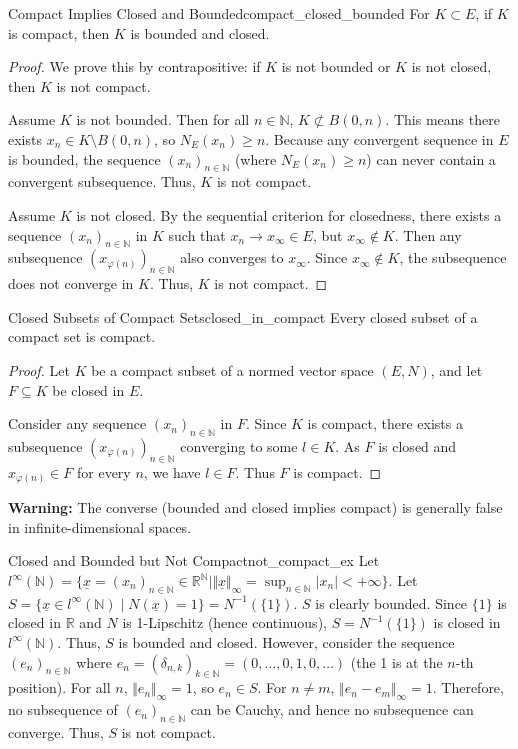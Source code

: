 \documentclass[11pt, a4paper]{article}
\newcommand{\R}{\mathbb{R}}
\newcommand{\N}{\mathbb{N}}
\begin{document}
\begin{proposition}{Compact Implies Closed and Bounded}{compact_closed_bounded}
For $K \subset E$, if $K$ is compact, then $K$ is bounded and closed.
\end{proposition}
\begin{proof}
We prove this by contrapositive: if $K$ is not bounded or $K$ is not closed, then $K$ is not compact.

Assume $K$ is not bounded.
Then for all $n \in \N$, $K \not\subset B(0, n)$. This means there exists $x_n \in K \setminus B(0, n)$, so $N_E(x_n) \ge n$.
Because any convergent sequence in $E$ is bounded, the sequence $(x_n)_{n \in \N}$ (where $N_E(x_n) \ge n$) can never contain a convergent subsequence. Thus, $K$ is not compact.

Assume $K$ is not closed.
By the sequential criterion for closedness, there exists a sequence $(x_n)_{n \in \N}$ in $K$ such that $x_n \to x_\infty \in E$, but $x_\infty \notin K$.
Then any subsequence $(x_{\varphi(n)})_{n \in \N}$ also converges to $x_\infty$. Since $x_\infty \notin K$, the subsequence does not converge in $K$. Thus, $K$ is not compact.
\end{proof}

\begin{proposition}{Closed Subsets of Compact Sets}{closed_in_compact}
Every closed subset of a compact set is compact.
\end{proposition}
\begin{proof}
Let $K$ be a compact subset of a normed vector space $(E, N)$, and let $F \subseteq K$ be closed in $E$.

Consider any sequence $(x_n)_{n \in \N}$ in $F$. Since $K$ is compact, there exists a subsequence $(x_{\varphi(n)})_{n \in \N}$ converging to some $l \in K$. As $F$ is closed and $x_{\varphi(n)} \in F$ for every $n$, we have $l \in F$. Thus $F$ is compact.
\end{proof}

\begin{remark}{}{}
\textbf{Warning:} The converse (bounded and closed implies compact) is generally false in infinite-dimensional spaces.
\end{remark}

\begin{example}{Closed and Bounded but Not Compact}{not_compact_ex}
Let $l^\infty(\N) = \{ \underline{x} = (x_n)_{n \in \N} \in \R^\N \mid \Vert \underline{x} \Vert_\infty = \sup_{n \in \N} |x_n| < +\infty \}$.
Let $S = \{ \underline{x} \in l^\infty(\N) \mid N(\underline{x}) = 1 \} = N^{-1}(\{1\})$.
$S$ is clearly bounded.
Since $\{1\}$ is closed in $\R$ and $N$ is 1-Lipschitz (hence continuous), $S = N^{-1}(\{1\})$ is closed in $l^\infty(\N)$.
Thus, $S$ is bounded and closed.
However, consider the sequence $(e_n)_{n \in \N}$ where $e_n = (\delta_{n, k})_{k \in \N} = (0, \dots, 0, 1, 0, \dots)$ (the 1 is at the $n$-th position).
For all $n$, $\Vert e_n \Vert_\infty = 1$, so $e_n \in S$.
For $n \neq m$, $\Vert e_n - e_m \Vert_\infty = 1$.
Therefore, no subsequence of $(e_n)_{n \in \N}$ can be Cauchy, and hence no subsequence can converge. Thus, $S$ is not compact.
\end{example}
\end{document}
